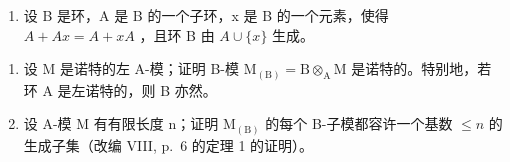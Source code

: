 \begin{enumerate}
\def\labelenumi{\arabic{enumi})}
\setcounter{enumi}{27}
\tightlist
\item
  设 B 是环，A 是 B 的一个子环，x 是 B 的一个元素，使得 \(A + Ax = A + xA\) ，且环 B 由 \(A \cup \{x\}\) 生成。
\end{enumerate}

\begin{enumerate}
\def\labelenumi{\alph{enumi})}
\item
  设 M 是诺特的左 A-模；证明 B-模 \(\mathrm{M}_{(\mathrm{B})} = \mathrm{B} \otimes_{\mathrm{A}} \mathrm{M}\) 是诺特的。特别地，若环 A 是左诺特的，则 B 亦然。
\item
  设 A-模 M 有有限长度 n；证明 \(\mathrm{M}_{(\mathrm{B})}\) 的每个 B-子模都容许一个基数 \(\leqslant n\) 的生成子集（改编 VIII, p.~6 的定理 1 的证明）。
\end{enumerate}


